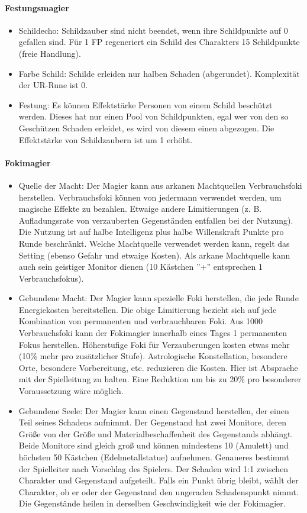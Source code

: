\documentclass{article}
\begin{document}
\paragraph{Festungsmagier}

\begin{itemize}
\item Schildecho: Schildzauber sind nicht beendet, wenn ihre Schildpunkte auf 0 gefallen sind. Für 1 FP regeneriert ein Schild des Charakters 15 Schildpunkte (freie Handlung).
\item Farbe Schild: Schilde erleiden nur halben Schaden (abgerundet). Komplexität der UR-Rune ist 0.
\item Festung: Es können Effektstärke Personen von einem Schild beschützt werden. Dieses hat nur einen Pool von Schildpunkten, egal wer von den so Geschützen Schaden erleidet, es wird von diesem einen abgezogen. Die Effektstärke von Schildzaubern ist um 1 erhöht.
\end{itemize}

\paragraph{Fokimagier}

\begin{itemize}
\item Quelle der Macht: Der Magier kann aus arkanen Machtquellen Verbrauchsfoki herstellen. Verbrauchsfoki können von jedermann verwendet werden, um magische Effekte zu bezahlen. Etwaige andere Limitierungen (z. B. Aufladungsrate von verzauberten Gegenständen entfallen bei der Nutzung). Die Nutzung ist auf halbe Intelligenz plus halbe Willenskraft Punkte pro Runde beschränkt. Welche Machtquelle verwendet werden kann, regelt das Setting (ebenso Gefahr und etwaige Kosten). Als arkane Machtquelle kann auch sein geistiger Monitor dienen (10 Kästchen ''+'' entsprechen 1 Verbrauchsfokus).
\item Gebundene Macht: Der Magier kann spezielle Foki herstellen, die jede Runde Energiekosten bereitstellen. Die obige Limitierung bezieht sich auf jede Kombination von permanenten und verbrauchbaren Foki. Aus 1000 Verbrauchsfoki kann der Fokimagier innerhalb eines Tages 1 permanenten Fokus herstellen. Höherstufige Foki für Verzauberungen kosten etwas mehr (10\% mehr pro zusätzlicher Stufe). Astrologische Konstellation, besondere Orte, besondere Vorbereitung, etc. reduzieren die Kosten. Hier ist Absprache mit der Spielleitung zu halten. Eine Reduktion um bis zu 20\% pro besonderer Voraussetzung wäre möglich.
\item Gebundene Seele: Der Magier kann einen Gegenstand herstellen, der einen Teil seines Schadens aufnimmt. Der Gegenstand hat zwei Monitore, deren Größe von der Größe und Materialbeschaffenheit des Gegenstands abhängt. Beide Monitore sind gleich groß und können mindestens 10 (Amulett) und höchsten 50 Kästchen (Edelmetallstatue) aufnehmen. Genaueres bestimmt der Spielleiter nach Vorschlag des Spielers. Der Schaden wird 1:1 zwischen Charakter und Gegenstand aufgeteilt. Falls ein Punkt übrig bleibt, wählt der Charakter, ob er oder der Gegenstand den ungeraden Schadenspunkt nimmt. Die Gegenstände heilen in derselben Geschwindigkeit wie der Fokimagier.
\end{itemize}
\end{document}
